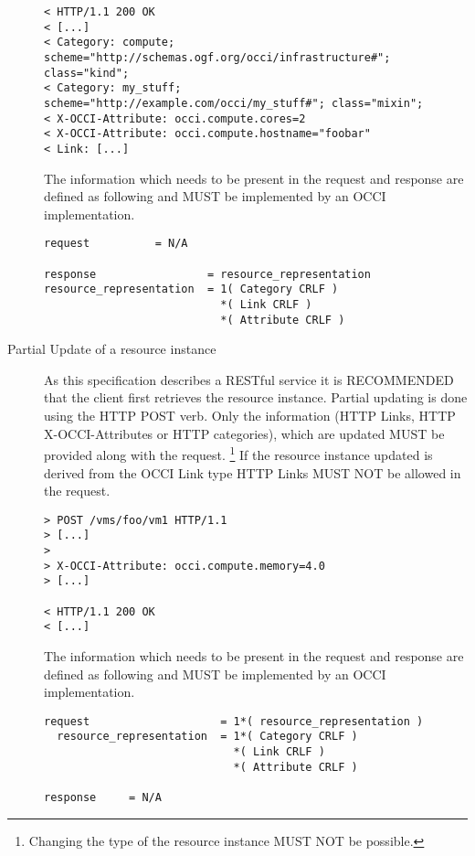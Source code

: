 \documentclass[10pt,a4paper]{article}
\begin{document}
\begin{description}
\begin{verbatim}
< HTTP/1.1 200 OK
< [...]
< Category: compute; scheme="http://schemas.ogf.org/occi/infrastructure#"; class="kind";
< Category: my_stuff; scheme="http://example.com/occi/my_stuff#"; class="mixin";
< X-OCCI-Attribute: occi.compute.cores=2
< X-OCCI-Attribute: occi.compute.hostname="foobar"
< Link: [...]
\end{verbatim}

    The information which needs to be present in the request and
    response are defined as following and MUST be implemented by an
    OCCI implementation.

\begin{verbatim}
request          = N/A

response                 = resource_representation
resource_representation  = 1( Category CRLF )
                           *( Link CRLF )
                           *( Attribute CRLF )
\end{verbatim}

  \item[Partial Update of a resource instance] As this
    specification describes a RESTful service it is RECOMMENDED that
    the client first retrieves the resource instance. Partial updating
    is done using the HTTP POST verb. Only the information (HTTP
    Links, HTTP X-OCCI-Attributes or HTTP categories), which are
    updated MUST be provided along with the
    request. \footnote{Changing the type of the resource instance MUST
      NOT be possible.} If the resource instance updated is derived
    from the OCCI Link type HTTP Links MUST NOT be allowed in the
    request.

\begin{verbatim}
> POST /vms/foo/vm1 HTTP/1.1
> [...]
> 
> X-OCCI-Attribute: occi.compute.memory=4.0
> [...]
 
< HTTP/1.1 200 OK
< [...]
\end{verbatim}

    The information which needs to be present in the request and
    response are defined as following and MUST be implemented by an
    OCCI implementation.

\begin{verbatim}
request                    = 1*( resource_representation )
  resource_representation  = 1*( Category CRLF )
                             *( Link CRLF )
                             *( Attribute CRLF )

response     = N/A

\end{verbatim}
    

\end{description}
\end{document}
